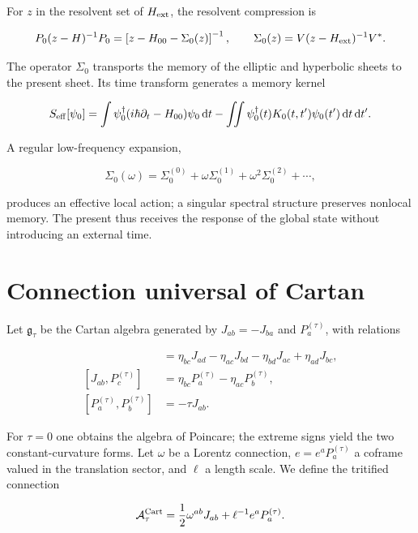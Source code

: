For \(z\) in the resolvent set of \(H_{\rm ext}\), the resolvent
compression is

\begin{equation}
P_0(z-H)^{-1}P_0
=\left[z-H_{00}-\Sigma_0(z)\right]^{-1},
\qquad
\Sigma_0(z)=V(z-H_{\rm ext})^{-1}V^*.
\label{eq:rm-feshbach-schur}
\end{equation}

The operator \(\Sigma_0\) transports the memory of the elliptic and hyperbolic
sheets to the present sheet. Its time transform generates a memory kernel

\[
S_{\rm eff}[\psi_0]
=\int\psi_0^\dagger(i\hbar\partial_t-H_{00})\psi_0\,\mathrm dt
-\iint\psi_0^\dagger(t)K_0(t,t')\psi_0(t')\,\mathrm dt\,\mathrm dt'.
\]

A regular low-frequency expansion,

\[
\Sigma_0(\omega)
=\Sigma_0^{(0)}+\omega\Sigma_0^{(1)}
+\omega^2\Sigma_0^{(2)}+\cdots,
\]

produces an effective local action; a singular spectral structure preserves
nonlocal memory. The present thus receives the response of the global state without
introducing an external time.

\section{Connection universal of Cartan}

Let \(\mathfrak g_\tau\) be the Cartan algebra generated by
\(J_{ab}=-J_{ba}\) and \(P_a^{(\tau)}\), with relations

\begin{align}
 [J_{ab},J_{cd}]&=
 \eta_{bc}J_{ad}-\eta_{ac}J_{bd}
 -\eta_{bd}J_{ac}+\eta_{ad}J_{bc},\\
 [J_{ab},P_c^{(\tau)}]&=
 \eta_{bc}P_a^{(\tau)}-\eta_{ac}P_b^{(\tau)},\\
 [P_a^{(\tau)},P_b^{(\tau)}]&=-\tau J_{ab}.
 \label{eq:rm-cartan-brackets}
\end{align}

For \(\tau=0\) one obtains the algebra of Poincare; the extreme signs yield the two constant-curvature forms. Let \(\omega\) be a Lorentz connection, \(e=e^aP_a^{(\tau)}\) a coframe valued in the translation sector, and \(\ell\) a length scale. We define the tritified connection

\begin{equation}
\mathcal A_\tau^{\rm Cart}
=\frac12\omega^{ab}J_{ab}+\ell^{-1}e^aP_a^{(\tau)}.
\label{eq:rm-trit-cartan-connection}
\end{equation}

